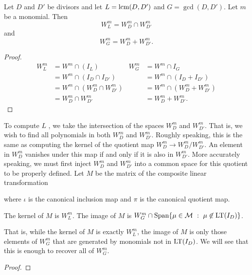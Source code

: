 \begin{proposition}
  Let $D$ and $D'$ be divisors and let $L = \operatorname{lcm}(D, D')$ and $G = \gcd(D, D')$.
  Let $m$ be a monomial. Then
    \[ W_L^m = W_D^m \cap W_{D'}^m \]
  and
    \[ W_G^m = W_D^m + W_{D'}^m. \]
\end{proposition}
\begin{proof}
  \begin{align*}
    W_L^m &= W^m \cap (I_L)                 & W_G^m &= W^m \cap I_G \\
          &= W^m \cap (I_D \cap I_{D'})            &&= W^m \cap (I_D + I_{D'}) \\
          &= W^m \cap (W_D^m \cap W_{D'}^m)        &&= W^m \cap (W_D^m + W_{D'}^m) \\
          &= W_D^m \cap W_{D'}^m                   &&= W_D^m + W_{D'}^m.
  \end{align*}
\end{proof}

To compute $L$ , we take the intersection of the spaces $W_D^m$ and $W_{D'}^m$.
That is, we wish to find all polynomials in both $W_D^m$ and $W_{D'}^m$.
Roughly speaking, this is the same as computing the kernel of the quotient map $W_D^m \to W_D^m/W_{D'}^m$.
An element in $W_D^m$ vanishes under this map if and only if it is also in $W_{D'}^m$.
More accurately speaking, we must first inject $W_D^m$ and $W_{D'}^m$ into a common space for this quotient to be properly defined.
Let $M$ be the matrix of the composite linear transformation
\begin{center}
\end{center}
where $\iota$ is the canonical inclusion map and $\pi$ is the canonical quotient map.

\begin{proposition}
  \label{prop_ker_im_M}
  The kernel of $M$ is $W_L^m$.
  The image of $M$ is $W_G^m \cap \operatorname{Span} \{ \mu \in \mathcal{M} ~:~ \mu \not \in \operatorname{LT}(I_D) \}$.
\end{proposition}
That is, while the kernel of $M$ is exactly $W_L^m$,
the image of $M$ is only those elements of $W_G^m$ that are generated by monomials not in $\operatorname{LT}(I_D)$.
We will see that this is enough to recover all of $W_G^m$.
\begin{proof}
\end{proof}

